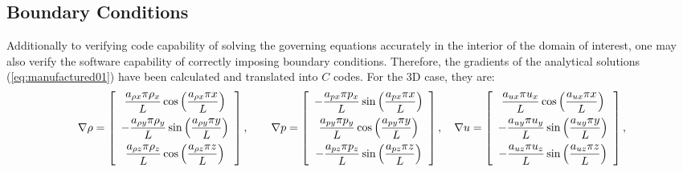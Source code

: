 \documentclass[10pt]{article}
\begin{document}
\subsection{Boundary Conditions}
Additionally to verifying code capability of solving the governing equations accurately in the interior of the domain of interest, one may also verify the software capability of correctly imposing boundary conditions. Therefore, the gradients of the  analytical solutions (\ref{eq:manufactured01}) have been calculated and translated into $C$ codes. For the 3D case, they are:
\begin{equation*}
\nabla  \rho= \left[ \begin{array}{c}
 \dfrac{  a_{\rho x}  \pi \rho_x}{L} \cos\left( \dfrac{ a_{\rho x}  \pi  x}{L}\right)\vspace{5pt} \\
-\dfrac{  a_{\rho y}  \pi \rho_y}{L} \sin\left( \dfrac{ a_{\rho y}  \pi  y}{L}\right)\vspace{5pt}\\
 \dfrac{  a_{\rho z}  \pi \rho_z}{L}  \cos\left( \dfrac{ a_{\rho z}  \pi  z}{L}\right)
\end{array} \right],
\qquad
\nabla p = \left[ \begin{array}{c}
- \dfrac{  a_{px}  \pi p_x}{L} \sin\left( \dfrac{ a_{px}  \pi  x}{L}\right)\vspace{5pt}\\
  \dfrac{  a_{py}  \pi p_y}{L} \cos\left( \dfrac{ a_{py}  \pi  y}{L}\right) \vspace{5pt}\\
- \dfrac{  a_{pz}  \pi p_z}{L} \sin\left( \dfrac{ a_{pz}  \pi  z}{L}\right)
\end{array} \right],
\quad
\nabla u = \left[ \begin{array}{c}
  \dfrac{  a_{ux}  \pi u_x}{L} \cos\left( \dfrac{ a_{ux}  \pi  x}{L}\right)\vspace{5pt}\\
 -   \dfrac{  a_{uy}  \pi u_y}{L} \sin\left( \dfrac{ a_{uy}  \pi  y}{L}\right)\vspace{5pt}\\
 -   \dfrac{  a_{uz}  \pi u_z}{L} \sin\left( \dfrac{ a_{uz}  \pi  z}{L}\right)
\end{array} \right],
\end{equation*}
\end{document}
